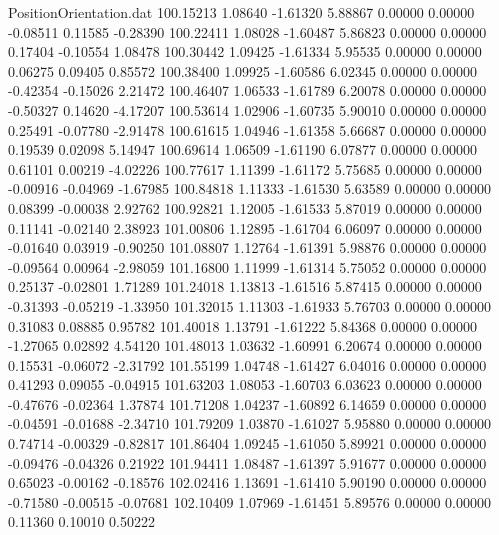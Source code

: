 \begin{filecontents}{PositionOrientation.dat}
 100.15213    1.08640   -1.61320     5.88867    0.00000    0.00000   -0.08511    0.11585   -0.28390
 100.22411    1.08028   -1.60487     5.86823    0.00000    0.00000    0.17404   -0.10554    1.08478
 100.30442    1.09425   -1.61334     5.95535    0.00000    0.00000    0.06275    0.09405    0.85572
 100.38400    1.09925   -1.60586     6.02345    0.00000    0.00000   -0.42354   -0.15026    2.21472
 100.46407    1.06533   -1.61789     6.20078    0.00000    0.00000   -0.50327    0.14620   -4.17207
 100.53614    1.02906   -1.60735     5.90010    0.00000    0.00000    0.25491   -0.07780   -2.91478
 100.61615    1.04946   -1.61358     5.66687    0.00000    0.00000    0.19539    0.02098    5.14947
 100.69614    1.06509   -1.61190     6.07877    0.00000    0.00000    0.61101    0.00219   -4.02226
 100.77617    1.11399   -1.61172     5.75685    0.00000    0.00000   -0.00916   -0.04969   -1.67985
 100.84818    1.11333   -1.61530     5.63589    0.00000    0.00000    0.08399   -0.00038    2.92762
 100.92821    1.12005   -1.61533     5.87019    0.00000    0.00000    0.11141   -0.02140    2.38923
 101.00806    1.12895   -1.61704     6.06097    0.00000    0.00000   -0.01640    0.03919   -0.90250
 101.08807    1.12764   -1.61391     5.98876    0.00000    0.00000   -0.09564    0.00964   -2.98059
 101.16800    1.11999   -1.61314     5.75052    0.00000    0.00000    0.25137   -0.02801    1.71289
 101.24018    1.13813   -1.61516     5.87415    0.00000    0.00000   -0.31393   -0.05219   -1.33950
 101.32015    1.11303   -1.61933     5.76703    0.00000    0.00000    0.31083    0.08885    0.95782
 101.40018    1.13791   -1.61222     5.84368    0.00000    0.00000   -1.27065    0.02892    4.54120
 101.48013    1.03632   -1.60991     6.20674    0.00000    0.00000    0.15531   -0.06072   -2.31792
 101.55199    1.04748   -1.61427     6.04016    0.00000    0.00000    0.41293    0.09055   -0.04915
 101.63203    1.08053   -1.60703     6.03623    0.00000    0.00000   -0.47676   -0.02364    1.37874
 101.71208    1.04237   -1.60892     6.14659    0.00000    0.00000   -0.04591   -0.01688   -2.34710
 101.79209    1.03870   -1.61027     5.95880    0.00000    0.00000    0.74714   -0.00329   -0.82817
 101.86404    1.09245   -1.61050     5.89921    0.00000    0.00000   -0.09476   -0.04326    0.21922
 101.94411    1.08487   -1.61397     5.91677    0.00000    0.00000    0.65023   -0.00162   -0.18576
 102.02416    1.13691   -1.61410     5.90190    0.00000    0.00000   -0.71580   -0.00515   -0.07681
 102.10409    1.07969   -1.61451     5.89576    0.00000    0.00000    0.11360    0.10010    0.50222

\end{filecontents}
